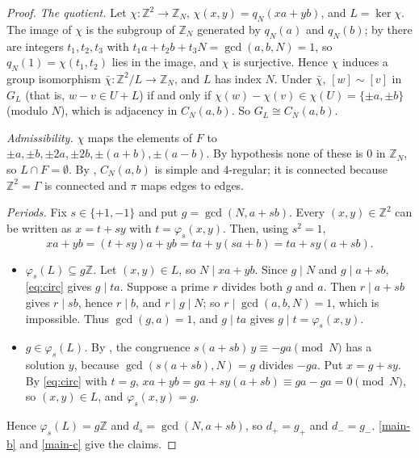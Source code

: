 \documentclass[11pt]{article}
\theoremstyle{plain}
\theoremstyle{definition}
\theoremstyle{remark}
\newcommand{\Z}{\mathbb{Z}}
\begin{document}
\begin{proof}
\emph{The quotient.} Let $\chi : \Z^2 \to \Z_N$, $\chi(x,y) = q_N(xa + yb)$, and
$L = \ker\chi$. The image of $\chi$ is the subgroup of $\Z_N$ generated by $q_N(a)$ and
$q_N(b)$; by  there are integers $t_1, t_2, t_3$ with
$t_1 a + t_2 b + t_3 N = \gcd(a,b,N) = 1$, so $q_N(1) = \chi(t_1, t_2)$ lies in the image, and
$\chi$ is surjective. Hence $\chi$ induces a group isomorphism $\bar\chi : \Z^2/L \to \Z_N$,
and $L$ has index $N$. Under $\bar\chi$, $[w] \sim [v]$ in $G_L$ (that is,
$w - v \in U + L$) if and only if $\chi(w) - \chi(v) \in \chi(U) = \{\pm a, \pm b\}$ (modulo
$N$), which is adjacency in $C_N(a,b)$. So $G_L \cong C_N(a,b)$.

\emph{Admissibility.} $\chi$ maps the elements of $F$ to
$\pm a, \pm b, \pm 2a, \pm 2b, \pm(a+b), \pm(a-b)$. By hypothesis none of these is $0$ in
$\Z_N$, so $L \cap F = \emptyset$. By , $C_N(a,b)$ is simple and
$4$-regular; it is connected because $\Z^2 = \Gamma$ is connected and $\pi$ maps edges to
edges.

\emph{Periods.} Fix $s \in \{+1,-1\}$ and put $g = \gcd(N, a + sb)$. Every $(x,y) \in \Z^2$
can be written as $x = t + sy$ with $t = \varphi_s(x,y)$. Then, using $s^2 = 1$,
\begin{equation}\label{eq:circ}
xa + yb = (t + sy)a + yb = ta + y(sa + b) = ta + sy(a + sb).
\end{equation}
\begin{itemize}
  \item \emph{$\varphi_s(L) \subseteq g\Z$.} Let $(x,y) \in L$, so $N \mid xa + yb$. Since
        $g \mid N$ and $g \mid a + sb$, \eqref{eq:circ} gives $g \mid ta$. Suppose a prime
        $r$ divides both $g$ and $a$. Then $r \mid a + sb$ gives $r \mid sb$, hence
        $r \mid b$, and $r \mid g \mid N$; so $r \mid \gcd(a,b,N) = 1$, which is impossible.
        Thus $\gcd(g, a) = 1$, and $g \mid ta$ gives $g \mid t = \varphi_s(x,y)$.
  \item \emph{$g \in \varphi_s(L)$.} By , the congruence
        $s(a + sb)\,y \equiv -ga \pmod N$ has a solution $y$, because
        $\gcd(s(a+sb), N) = g$ divides $-ga$. Put $x = g + sy$. By \eqref{eq:circ} with
        $t = g$, $xa + yb = ga + sy(a + sb) \equiv ga - ga = 0 \pmod N$, so
        $(x,y) \in L$, and $\varphi_s(x,y) = g$.
\end{itemize}
Hence $\varphi_s(L) = g\Z$ and $d_s = \gcd(N, a + sb)$, so $d_{+} = g_{+}$ and
$d_{-} = g_{-}$. \ref{main-b} and \ref{main-c} give the claims.
\end{proof}
\end{document}
